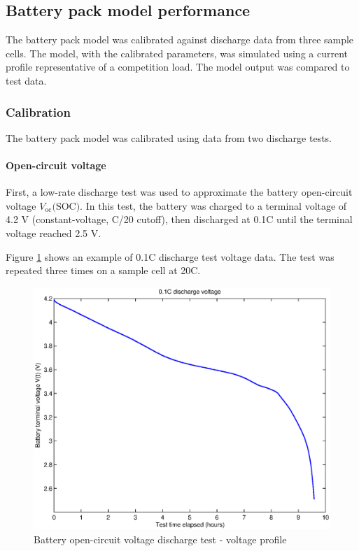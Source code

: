 \documentclass[../SimBALink.tex]{subfiles}
\begin{document}
\subsection{Battery pack model performance}
	The battery pack model was calibrated against discharge data from three sample cells. The model, with the calibrated parameters, was simulated using a current profile representative of a competition load. The model output was compared to test data.
	\subsubsection{Calibration}
		The battery pack model was calibrated using data from two discharge tests.
		
		\paragraph{Open-circuit voltage}
			First, a low-rate discharge test was used to approximate the battery open-circuit voltage $V_\text{oc}(\text{SOC)}$. In this test, the battery was charged to a terminal voltage of 4.2 V (constant-voltage, C/20 cutoff), then discharged at 0.1C until the terminal voltage reached 2.5 V.  
			
			Figure \ref{fig:0.1C_Discharge_Voltage_Profile} shows an example of 0.1C discharge test voltage data. The test was repeated three times on a sample cell at 20\degree C.
		
			\begin{figure}[h!]
				\centering
				\includegraphics[width=5in]{1dC_Discharge_Voltage_Profile}
				\caption{Battery open-circuit voltage discharge test - voltage profile}
				\label{fig:0.1C_Discharge_Voltage_Profile}
			\end{figure}
		
\end{document}
